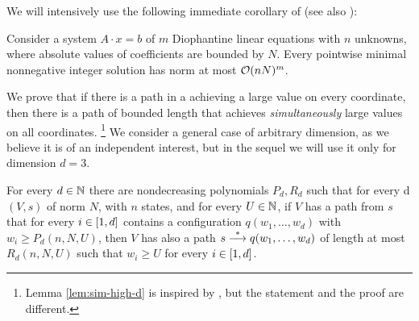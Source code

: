 We will intensively use the following immediate corollary of \cite{Pottier91}
(see also \cite[Prop.~4]{taming}):
%
\begin{lemma}%
[\cite{taming}, Prop.~4]
\label{lem:taming}
Consider a system $A\cdot x = b$ of $m$ Diophantine linear equations with $n$ unknowns,
where absolute values of coefficients are bounded by $N$.
Every pointwise minimal nonnegative integer solution has norm at most
${\cal O}(nN)^m$.
\end{lemma}



We prove that
if there is a path in a \vass achieving a large value on every coordinate,
then there is a path of bounded length that achieves \emph{simultaneously} large values on all coordinates.%
\footnote{Lemma \ref{lem:sim-high-d} is inspired by \cite[Lemma 4.13]{LS19}, 
but the statement and the proof are different.}
We consider a general case of arbitrary dimension,
as we believe it is of an independent interest, but in the sequel we will use it only for dimension $d = 3$.

\begin{lemma}\label{lem:sim-high-d}
For every $d \in \mathbb{N}$ there are nondecreasing polynomials $P_d, R_d$ such that 
for every \parvass d $(V, s)$ of norm $N$, with $n$ states, and for every $U\in\mathbb{N}$,
if $V$ has a path from $s$ that for every $i\in[1, d]$ contains a configuration 
$q(w_1, \ldots, w_d)$ with $w_i \geq P_d(n, N, U)$,
then $V$ has also a path $s \stackrel{*}{\longrightarrow} q(w_1, \ldots, w_d)$ of length at most $R_d(n, N, U)$
such that $w_i \geq U$ for every $i\in[1, d]$.
\end{lemma}

